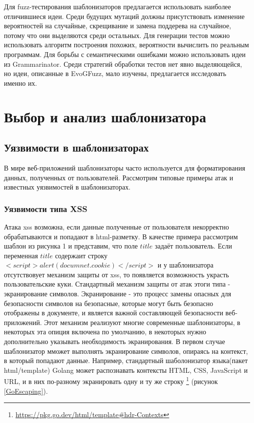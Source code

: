\documentclass[a4paper]{article}
\begin{document}
Для fuzz-тестирования шаблонизаторов предлагается использовать наиболее отличившиеся идеи. Среди будущих мутаций должны присутствовать изменение вероятностей на случайные, скрещивание и замена поддерева на случайное, потому что они выделяются среди остальных. Для генерации тестов можно использовать алгоритм построения похожих, вероятности вычислить по реальным программам. Для борьбы с семантическими ошибками можно использовать идеи из Grammarinator. Среди стратегий обработки тестов нет явно выделяющейся, но идеи, описанные в EvoGFuzz, мало изучены, предлагается исследовать именно их.

\newpage
\section{Выбор и анализ шаблонизатора}
\indent

\subsection{Уязвимости в шаблонизаторах}
\indent

В мире веб-приложений шаблонизаторы часто используется для форматирования данных, полученных от пользователей. Рассмотрим типовые примеры атак и известных уязвимостей в шаблонизаторах.

\subsubsection{Уязвимости типа XSS}

Атака xss возможна, если данные полученные от пользователя некорректно обрабатываются и попадают в html-разметку. В качестве примера рассмотрим шаблон из рисунка 1 и представим, что поле $title$ задаёт пользователь. Если переменная $title$ содержаит строку $<script>alert(documnet.cookie)</script>$ и у шаблонизатора отсутствовует механизм защиты от xss, то появляется возможность украсть пользовательские куки. Стандартный механизм защиты от атак этоги типа - экранирование символов. Экранирование - это процесс замены опасных для безопасности символов на безопасные, которые могут быть безопасно отображены в документе, и является важной составляющей безопасности веб-приложений. Этот механизм реализуют многие современные шаблонизаторы, в некоторых эта опиция включена по умолчанию, в некоторых нужно дополнительно указывать необходимость экранирования. В первом случае шаблонизатор мможет выполнять экранирование символов, опираясь на контекст, в который попадают данные. Например, стандартный шаболонизатор языка(пакет html/template) Golang может распознавать контексты HTML, CSS, JavaScript и URL, и в них по-разному экранировать одну и ту же строку \footnote{\href{https://pkg.go.dev/html/template\#hdr-Contexts}{https://pkg.go.dev/html/template\#hdr-Contexts}} (рисунок \ref{GoEscaping}).
\end{document}
